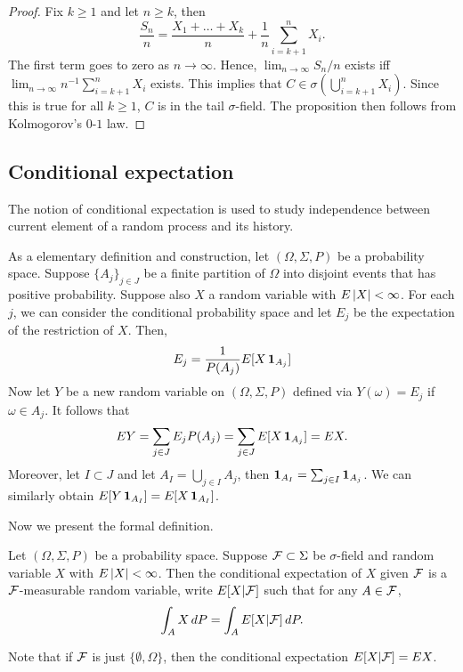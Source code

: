 \documentclass[a4paper]{article}
\begin{document}
\begin{proof}
  Fix $k \geq 1$ and let $n \geq k$, then
  \[
  \frac{S_n}{n} 
  = \frac{X_1 + \dots + X_k}{n} + \frac{1}{n} \sum_{i = k + 1}^n X_i.
  \]
  The first term goes to zero as $n \to \infty$.
  Hence, $\lim_{n \to \infty} S_n / n$ exists 
  iff $\lim_{n \to \infty} n^{-1} \sum_{i = k + 1}^n X_i$ exists.
  This implies that $C \in \sigma (\bigcup_{i = k + 1}^n X_i)$.
  Since this is true for all $k \geq 1$, $C$ is in the tail 
  $\sigma$-field. The proposition then follows from Kolmogorov's 
  $0$-$1$ law.

\end{proof}

\subsection{Conditional expectation}

The notion of conditional expectation is used to study independence 
between current element of a random process and its history.

As a elementary definition and construction, 
let $(\Omega, \Sigma, P)$ be a probability space. 
Suppose $\{ A_j \}_{j \in J}$ be a finite partition of $\Omega$ 
into disjoint events that has positive probability.
Suppose also $X$ a random variable with $E \left\lvert X\right\rvert < 
\infty$. For each $j$, we can consider the conditional probability
space and let $E_j$ be the expectation of the restriction of $X$.
Then, 
\[
  E_j = \frac{1}{P (A_j)} E [X \operatorname{\mathbf{1}}_{A_j}]
\]
Now let $Y$ be a new random variable on $(\Omega, \Sigma, P)$ defined 
via $Y (\omega) = E_j$ if $\omega \in A_j$. It follows that 
\[
  E Y 
  = \sum_{j \in J} E_j P(A_j) 
  = \sum_{j \in J} E [X \operatorname{\mathbf{1}}_{A_j}] 
  = E X.
\]
Moreover, let $I \subset J$ and let $A_I = \bigcup_{j \in I} A_j$,
then $\operatorname{\mathbf{1}}_{A_I} = \sum_{j \in I} \operatorname{\mathbf{1}}_{A_j}$.
We can similarly obtain $E [Y \operatorname{\mathbf{1}}_{A_I}] = E [X \operatorname{\mathbf{1}}_{A_I}]$.

Now we present the formal definition.
\begin{defi}
  Let $(\Omega, \Sigma, P)$ be a probability space.
  Suppose $\mathcal{F} \subset \Sigma$ be $\sigma$-field and random 
  variable $X$ with $E \left\lvert X\right\rvert < \infty$.
  Then the conditional expectation of $X$ given $\mathcal{F}$ 
  is a $\mathcal{F}$-measurable random variable, write $E [X | \mathcal{F}]$
  such that for any $A \in \mathcal{F}$,
  \[
    \int_A X \, d P = \int_A E [X | \mathcal{F}] \, d P.
  \]
\end{defi}

\begin{remark}
  Note that if $\mathcal{F}$ is just $\{ \emptyset, \Omega \}$, then
  the conditional expectation $E [X | \mathcal{F}] = E X$.
\end{remark}
\end{document}
